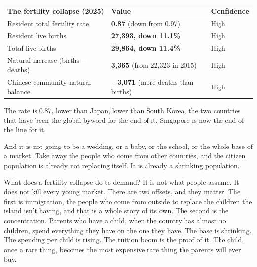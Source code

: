 \documentclass[10pt,twoside,openany]{memoir}
\renewcommand{\arraystretch}{1.1}
\begin{document}
{{{{{{{{{{{{{{{{{{\def\LTcaptype{none} %
{\renewcommand{\arraystretch}{0.9}\begin{longtable}[]{@{}
  >{\raggedright\arraybackslash}p{}
  >{\raggedright\arraybackslash}p{}
  >{\raggedright\arraybackslash}p{}@{}}
\toprule\noalign{}
\begin{minipage}[b]{\linewidth}\raggedright
The fertility collapse (2025)
\end{minipage} & \begin{minipage}[b]{\linewidth}\raggedright
Value
\end{minipage} & \begin{minipage}[b]{\linewidth}\raggedright
Confidence
\end{minipage} \\
\midrule\noalign{}
\endhead
\bottomrule\noalign{}
\endlastfoot
Resident total fertility rate & \textbf{0.87} (down from 0.97) & High \\
Resident live births & \textbf{27,393, down 11.1\%} & High \\
Total live births & \textbf{29,864, down 11.4\%} & High \\
Natural increase (births − deaths) & \textbf{3,365} (from 22,323 in
2015) & High \\
Chinese-community natural balance & \textbf{−3,071} (more deaths than
births) & High \\
\end{longtable}
}

The rate is 0.87, lower than Japan, lower than South Korea, the two
countries that have been the global byword for the end of it. Singapore
is now the end of the line for it.

And it is not going to be a wedding, or a baby, or the school, or the
whole base of a market. Take away the people who come from other
countries, and the citizen population is already not replacing itself.
It is already a shrinking population.

What does a fertility collapse do to demand? It is not what people
assume. It does not kill every young market. There are two offsets, and
they matter. The first is immigration, the people who come from outside
to replace the children the island isn't having, and that is a whole
story of its own. The second is the concentration. Parents who have a
child, when the country has almost no children, spend everything they
have on the one they have. The base is shrinking. The spending per child
is rising. The tuition boom is the proof of it. The child, once a rare
thing, becomes the most expensive rare thing the parents will ever buy.

}}}}}}}}}}}}}}}}}}
\end{document}
